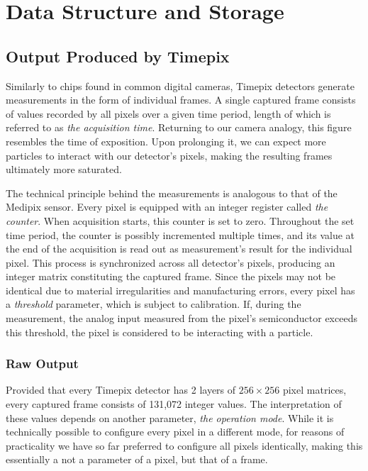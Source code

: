 \chapter{Data Structure and Storage}

\section{Output Produced by Timepix}
Similarly to chips found in common digital cameras, Timepix detectors generate measurements in the form of individual frames. A single captured frame consists of values recorded by all pixels over a given time period, length of which is referred to as \textit{the acquisition time}. Returning to our camera analogy, this figure resembles the time of exposition. Upon prolonging it, we can expect more particles to interact with our detector's pixels, making the resulting frames ultimately more saturated.

The technical principle behind the measurements is analogous to that of the Medipix sensor. Every pixel is equipped with an integer register called \textit{the counter}. When acquisition starts, this counter is set to zero. Throughout the set time period, the counter is possibly incremented multiple times, and its value at the end of the acquisition is read out as measurement's result for the individual pixel. This process is synchronized across all detector's pixels, producing an integer matrix constituting the captured frame. Since the pixels may not be identical due to material irregularities and manufacturing errors, every pixel has a \textit{threshold} parameter, which is subject to calibration. If, during the measurement, the analog input measured from the pixel's semiconductor exceeds this threshold, the pixel is considered to be interacting with a particle.

\subsection{Raw Output}

Provided that every Timepix detector has 2 layers of $256 \times 256$ pixel matrices, every captured frame consists of 131,072 integer values. The interpretation of these values depends on another parameter, \textit{the operation mode}. While it is technically possible to configure every pixel in a different mode, for reasons of practicality we have so far preferred to configure all pixels identically, making this essentially a not a parameter of a pixel, but that of a frame.

